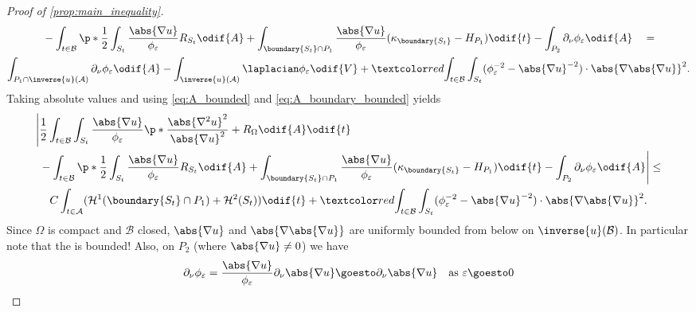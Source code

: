 \documentclass[titlepage,numbers=noenddot,oneside,%
cleardoublepage=empty,paper=a4,fontsize=11pt,%
english,%
]{scrartcl}
\begin{document}
{\begin{proof}[Proof of \cref{prop:main_inequality}]
\begin{multline*}
\begin{aligned}[b]
                    {} & -\int_{t\in \mathcal{B}}\p*{\frac{1}{2}\int_{S_t}\frac{\abs{\nabla u}}{\phi_\varepsilon}R_{S_t}\odif{A}+\int_{\boundary{S_t}\cap P_1}\frac{\abs{\nabla u}}{\phi_\varepsilon}(\kappa_{\boundary{S_t}}-H_{P_1})} \odif{t}-\int_{P_2}\partial_{\nu}\phi_\varepsilon\odif{A}
                \end{aligned}=\\
                \int_{P_1\cap \inverse{u}(\mathcal{A})}\partial_\nu \phi_\varepsilon\odif{A}-\int_{\inverse{u}(\mathcal{A})}\laplacian \phi_{\varepsilon}\odif{V}+\additionalTerms{\int_{t \in \mathcal{B}}\int_{S_t}(\phi_{\varepsilon}^{-2}-\abs{\nabla u}^{-2})\cdot\abs{\nabla\abs{\nabla u}}^2}.
            \end{multline*}
            Taking absolute values and using \cref{eq:A_bounded} and \cref{eq:A_boundary_bounded} yields
            \begin{multline}\label{eq:main_equality_nearly_there}
                \begin{aligned}[b]
                    \Bigg\lvert & \frac{1}{2}\int_{t\in \mathcal{B}}\int_{S_t}\frac{\abs{\nabla u}}{\phi_\varepsilon}\p*{\frac{\abs{\nabla^2 u}^2}{\abs{\nabla u}^2}+R_{\Omega}}\odif{A}\odif{t}                                                                                                                       \\
                    {}          & -\int_{t\in \mathcal{B}}\p*{\frac{1}{2}\int_{S_t}\frac{\abs{\nabla u}}{\phi_\varepsilon}R_{S_t}\odif{A}+\int_{\boundary{S_t}\cap P_1}\frac{\abs{\nabla u}}{\phi_\varepsilon}(\kappa_{\boundary{S_t}}-H_{P_1})} \odif{t}-\int_{P_2}\partial_{\nu}\phi_\varepsilon\odif{A}\Bigg\rvert
                \end{aligned}\leq \\
                C\int_{t\in \mathcal{A}}(\mathcal{H}^1(\boundary{S_t}\cap P_1)+\mathcal{H}^2(S_t))\odif{t}+\additionalTerms{\int_{t \in \mathcal{B}}\int_{S_t}(\phi_{\varepsilon}^{-2}-\abs{\nabla u}^{-2})\cdot\abs{\nabla\abs{\nabla u}}^2}.
            \end{multline}
            Since \( \Omega \) is compact and \( \mathcal{B} \) closed, \( \abs{\nabla u} \) and \( \abs{\nabla \abs{\nabla u}} \) are uniformly bounded from below on \( \inverse{u}(\mathcal{B}) \). In particular note that the  is bounded! Also, on \( P_2 \) (where \( \abs{\nabla u}\neq 0 \)) we have
            \begin{equation*}
                \partial_\nu \phi_\varepsilon=\frac{\abs{\nabla u}}{\phi_\varepsilon}\partial_{\nu}\abs{\nabla u}\goesto \partial_{\nu}\abs{\nabla u}\quad \text{as \( \varepsilon\goesto 0 \)}

\end{equation*}
\end{proof}}
\end{document}

